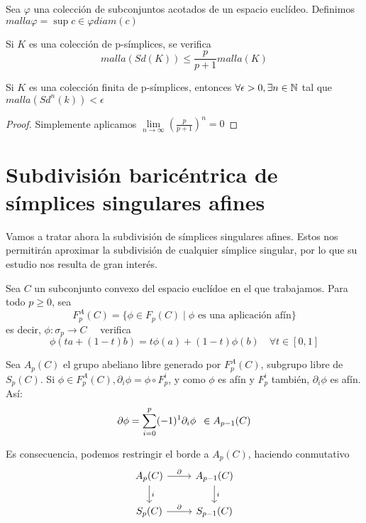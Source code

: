 \begin{definition}
  Sea $\varphi$ una colección de subconjuntos acotados de un espacio euclídeo. Definimos $malla \varphi = \sup\limits{c \in \varphi} diam(c)$
\end{definition}

\begin{corollary}
  Si $K$ es una colección de p-símplices, se verifica \[malla(Sd(K)) \leq \frac{p}{p+1} malla(K) \]
\end{corollary}

\begin{corollary}
  Si $K$ es una colección finita de p-símplices, entonces $\forall \epsilon > 0, \exists n \in {\mathbb N}$ tal que \\$malla(Sd^n(k)) < \epsilon$
\end{corollary}

\begin{proof}
  Simplemente aplicamos $\lim\limits_{n \to \infty}(\frac{p}{p+1})^n = 0$
\end{proof}

\section{Subdivisión baricéntrica de símplices singulares afines}

Vamos a tratar ahora la subdivisión de símplices singulares afines. Estos nos permitirán aproximar la
subdivisión de cualquier símplice singular, por lo que su estudio nos resulta de gran interés.

Sea $C$ un subconjunto convexo del espacio euclídoe en el que trabajamos. Para todo $p \geq 0$, sea
\[F_p^A(C) = \{ \phi \in F_p(C) \mid \phi \text{ es una aplicación afín}\} \]
es decir, $\phi \colon \sigma_p \to C \quad$ verifica \[\phi(ta + (1-t)b) = t\phi(a) + (1-t)\phi(b) \hspace{1em} \forall t \in [0,1]\]

Sea $A_p(C)$ el grupo abeliano libre generado por $F_p^A(C)$, subgrupo libre de $S_p(C)$. Si $\phi \in F_p^A(C), \partial_i \phi = \phi \circ F_p^i$,
y como $\phi$ es afín y $F_p^i$ también, $\partial_i \phi$ es afín. Así:
\[\partial \phi = \sum\limits_{i = 0}^p (-1)^1 \partial_i \phi \hspace{0.5em} \in A_{p-1}(C)\]

Es consecuencia, podemos restringir el borde a $A_p(C)$, haciendo conmutativo
\[ \begin{tikzcd}
      A_p(C) \arrow{r}{\partial} \arrow{d}{i} & A_{p-1}(C) \arrow{d}{i} \\
      S_p(C) \arrow{r}{\partial} & S_{p-1}(C)
\end{tikzcd} \]

